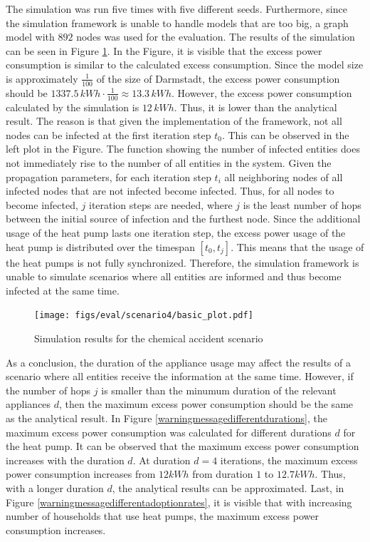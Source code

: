 The simulation was run five times with five different seeds. 
Furthermore, since the simulation framework is unable
to handle models that are too big, a graph model with 
$892$ nodes was used for the evaluation. 
The results of the simulation can be seen in 
Figure \ref{warningmessagesimulations}.
In the Figure, it is visible that the excess power 
consumption is similar to the calculated excess
consumption. Since the model size is approximately
$\frac{1}{100}$ of the size of Darmstadt, the 
excess power consumption should be
$1337.5\,kWh\cdot \frac{1}{100} \approx 13.3\,kWh $.
However, the excess power consumption 
calculated by the simulation is $12\,kWh$.
Thus, it is lower than the analytical result.
The reason is that given the implementation of the 
framework, not all nodes can be infected at the first
iteration step $t_0$. This can be observed in the 
left plot in the Figure. The function showing the 
number of infected entities does not immediately
rise to the number of all entities in the system.
Given the propagation 
parameters, for each iteration step $t_{i}$ all
neighboring nodes of all infected nodes that
are not infected become infected. Thus, for 
all nodes to become infected, $j$ iteration steps 
are needed, where $j$ is the least number of hops between 
the initial source of infection and the furthest 
node. Since the additional usage of the heat pump 
lasts one iteration step, the excess power usage
of the heat pump is distributed over 
the timespan $[t_0, t_j]$. 
This means that the 
usage of the heat pumps is not fully synchronized.
Therefore, the simulation framework is unable
to simulate scenarios where all entities 
are informed and thus become infected at the 
same time. 


\begin{figure}[!ht]
    \center
    \texttt{[image: figs/eval/scenario4/basic\_plot.pdf]}
    \caption{Simulation results for the chemical accident scenario}
    \label{warningmessagesimulations}
\end{figure}

As a conclusion, the duration of the appliance 
usage may affect the results of a scenario where 
all entities receive the information at the same time.
However, if the number of hops $j$ is smaller than
the minumum duration of the relevant appliances $d$,
then the maximum excess power consumption should 
be the same as the analytical result. 
In Figure \ref{warningmessagedifferentdurations},
the maximum excess power consumption was calculated
for different durations $d$ for the heat pump.
It can be observed that the maximum excess power 
consumption increases with the duration $d$.
At duration $d=4$ iterations, the maximum excess power consumption
increases from $12kWh$ from duration $1$ to 
$12.7kWh$. Thus, with a longer duration $d$, the 
analytical results can be approximated.
Last, in Figure \ref{warningmessagedifferentadoptionrates},
it is visible that with increasing number of households 
that use heat pumps, the maximum excess power consumption
increases.

